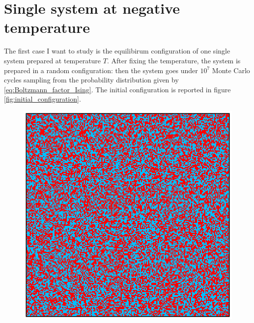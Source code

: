 \section{Single system at negative temperature}
The first case I want to study is the equilibirum configuration of one single system prepared at temperature $T$. After fixing the temperature, the system is prepared in a random configuration: then the system goes under $10^7$ Monte Carlo cycles 
sampling from the probability distribution given by \ref{eq:Boltzmann_factor_Ising}. The initial configuration is reported in figure \ref{fig:initial_configuration}. \\
\begin{figure}
    \centering 
    \begin{minipage}[c]{0.45\textwidth}
        \centering
        \includegraphics[scale=0.38]{./images/ising/initconf.eps}
    \end{minipage}
    \begin{minipage}[c]{0.45\textwidth}
        \centering

\end{minipage}
\end{figure}

